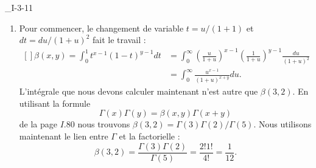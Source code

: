 \begin{corrige}{_I-3-11}
\begin{enumerate}
\item
Pour commencer, le changement de variable $t=u/(1+1)$ et $dt=du/(1+u)^2$ fait le travail :
\begin{equation}
	\begin{aligned}[]
	\beta(x,y)=\int_0^1t^{x-1}(1-t)^{y-1}dt&=\int_0^{\infty}\left( \frac{ u }{ 1+u } \right)^{x-1}\left( \frac{1}{ 1+u } \right)^{y-1}\frac{ du }{ (1+u)^2 }\\
						&=\int_0^{\infty}\frac{ u^{x-1} }{ (1+u)^{x+y} }du.
	\end{aligned}
\end{equation}
L'intégrale que nous devons calculer maintenant n'est autre que $\beta(3,2)$. En utilisant la formule
\begin{equation}
	\Gamma(x)\Gamma(y)=\beta(x,y)\Gamma(x+y)
\end{equation}
de la page $I.80$  nous trouvons $\beta(3,2)=\Gamma(3)\Gamma(2)/\Gamma(5)$. Nous utilisons maintenant le lien entre $\Gamma$ et la factorielle :
\begin{equation}
	\beta(3,2)=\frac{ \Gamma(3)\Gamma(2) }{ \Gamma(5) }=\frac{ 2!1! }{ 4! }=\frac{1}{ 12 }.
\end{equation}

\end{enumerate}
\end{corrige}
